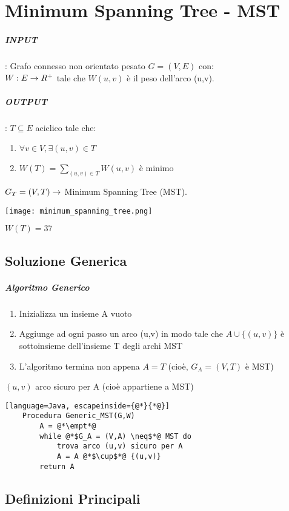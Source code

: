 \chapter{Minimum Spanning Tree - MST}
\paragraph*{INPUT}: Grafo connesso non orientato pesato $G=(V,E)$ con:\\
$W:E \rightarrow R^+$ tale che $W(u,v)$ è il peso dell'arco (u,v).
\paragraph*{OUTPUT}: $T \subseteq E$ aciclico tale che:
\begin{enumerate}
    \item $\forall v \in V, \exists (u,v) \in T$
    \item $W(T) = \sum_{(u,v)\in T} W(u,v)$ è minimo
\end{enumerate}
$G_T = (V,T) \rightarrow$ Minimum Spanning Tree (MST).
\begin{center}
    \texttt{[image: minimum\_spanning\_tree.png]}
\end{center}
$W(T)=37$
\section{Soluzione Generica}
\paragraph*{Algoritmo Generico}
\begin{enumerate}
    \item Inizializza un insieme A vuoto
    \item Aggiunge ad ogni passo un arco (u,v) in modo tale che $A \cup \{(u,v)\}$
    è sottoinsieme dell'insieme T degli archi MST
    \item L'algoritmo termina non appena $A=T$ (cioè, $G_A=(V,T)$ è MST)
\end{enumerate}
$(u,v)$ \ra arco sicuro per A (cioè appartiene a MST)
\begin{lstlisting}[language=Java, escapeinside={@*}{*@}]
    Procedura Generic_MST(G,W)
        A = @*\empt*@
        while @*$G_A = (V,A) \neq$*@ MST do
            trova arco (u,v) sicuro per A
            A = A @*$\cup$*@ {(u,v)}
        return A
\end{lstlisting}
\section{Definizioni Principali}
